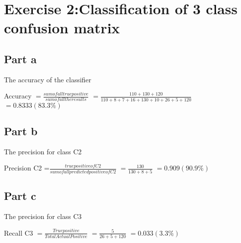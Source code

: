 \documentclass[a4paper, 10pt]{article}
\begin{document}
\section{Exercise 2:Classification of 3 class confusion matrix}
\subsection{Part a}
The accuracy of the classifier

Accuracy $=\frac{sum of all true positive}{sum of all the results}$
         $=\frac{110+130+120}{110+8+7+16+130+10+26+5+120}$
         $= 0.8333 (83.3 \% )$
          
\subsection{Part b}

The precision for class C2

Precision C2 =$\frac{true positive of C2}{sum of all predicted positive of C2}$
             $=\frac{130}{130+8+5}$ 
             $=0.909 (90.9\%)$

\subsection{Part c}

The precision for class C3

Recall C3 $=\frac{True positive}{Total Actual Positive}$
          $=\frac{5}{26+5+120}$
          $=0.033 (3.3 \% )$
\end{document}

